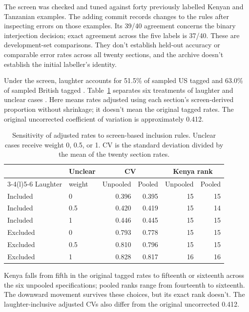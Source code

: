 \documentclass[12pt]{article}
\begin{document}
The screen was checked and tuned against forty previously labelled
Kenyan and Tanzanian examples. The adding commit records changes to
the rules after inspecting errors on those examples. Its 39/40 agreement
concerns the binary interjection decision; exact agreement across the
five labels is 37/40. These are development-set comparisons. They don't
establish held-out accuracy or comparable error rates across all twenty
sections, and the archive doesn't establish the initial labeller's identity.

Under the screen, laughter accounts for 51.5\% of sampled US tagged
 and 63.0\% of sampled British tagged . Table~\ref{tab:ha-sensitivity}
separates six treatments of laughter and unclear cases
\citep[cf.][]{gelman2014statcrisis}. Here  means rates adjusted
using each section's screen-derived proportion without shrinkage; it
doesn't mean the original tagged rates. The original uncorrected
coefficient of variation is approximately 0.412.

\begin{table}[htbp]
\centering
\small
\caption{Sensitivity of adjusted  rates to screen-based inclusion rules.
Unclear cases receive weight 0, 0.5, or 1. CV is the standard deviation
divided by the mean of the twenty section rates.}
\label{tab:ha-sensitivity}
\begin{tabular}{@{}llrrrr@{}}
\toprule
 & Unclear & \multicolumn{2}{c}{CV} & \multicolumn{2}{c}{Kenya rank} \\
\cmidrule(lr){3-4}\cmidrule(l){5-6}
Laughter & weight & Unpooled & Pooled & Unpooled & Pooled \\
\midrule
Included & 0   & 0.396 & 0.395 & 15 & 15 \\
Included & 0.5 & 0.420 & 0.419 & 15 & 14 \\
Included & 1   & 0.446 & 0.445 & 15 & 15 \\
Excluded & 0   & 0.793 & 0.778 & 15 & 15 \\
Excluded & 0.5 & 0.810 & 0.796 & 15 & 15 \\
Excluded & 1   & 0.828 & 0.817 & 16 & 16 \\
\bottomrule
\end{tabular}
\end{table}

Kenya falls from fifth in the original tagged rates to fifteenth or
sixteenth across the six unpooled specifications; pooled ranks range
from fourteenth to sixteenth. The downward movement survives these
choices, but its exact rank doesn't. The laughter-inclusive adjusted
CVs also differ from the original uncorrected 0.412.
\end{document}
